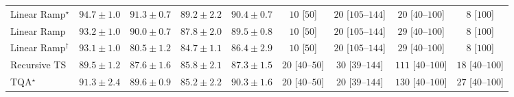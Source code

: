 \begin{tabular}{l|cccc|cccc|}
Linear Ramp$^\star$ & {\cellcolor[HTML]{00502D}} \color[HTML]{F1F1F1} $94.7\pm 1.0$ & {\cellcolor[HTML]{006536}} \color[HTML]{F1F1F1} $91.3\pm 0.7$ & {\cellcolor[HTML]{096F3A}} \color[HTML]{F1F1F1} $89.2\pm 2.2$ & {\cellcolor[HTML]{026A38}} \color[HTML]{F1F1F1} $90.4\pm 0.7$ & {\cellcolor[HTML]{FFF7F3}} \color[HTML]{000000} $10$ [$50$] & {\cellcolor[HTML]{FFF4F0}} \color[HTML]{000000} $20$ [$105$--$144$] & {\cellcolor[HTML]{FFF4F0}} \color[HTML]{000000} $20$ [$40$--$100$] & {\cellcolor[HTML]{FFF7F3}} \color[HTML]{000000} $8$ [$100$] \\
Linear Ramp & {\cellcolor[HTML]{005931}} \color[HTML]{F1F1F1} $93.2\pm 1.0$ & {\cellcolor[HTML]{056C39}} \color[HTML]{F1F1F1} $90.0\pm 0.7$ & {\cellcolor[HTML]{12763D}} \color[HTML]{F1F1F1} $87.8\pm 2.0$ & {\cellcolor[HTML]{086E3A}} \color[HTML]{F1F1F1} $89.5\pm 0.8$ & {\cellcolor[HTML]{FFF7F3}} \color[HTML]{000000} $10$ [$50$] & {\cellcolor[HTML]{FFF4F0}} \color[HTML]{000000} $20$ [$105$--$144$] & {\cellcolor[HTML]{FFF2EE}} \color[HTML]{000000} $29$ [$40$--$100$] & {\cellcolor[HTML]{FFF7F3}} \color[HTML]{000000} $8$ [$100$] \\
Linear Ramp$^\dagger$ & {\cellcolor[HTML]{005A31}} \color[HTML]{F1F1F1} $93.1\pm 1.0$ & {\cellcolor[HTML]{3BA358}} \color[HTML]{F1F1F1} $80.5\pm 1.2$ & {\cellcolor[HTML]{258745}} \color[HTML]{F1F1F1} $84.7\pm 1.1$ & {\cellcolor[HTML]{1A7D40}} \color[HTML]{F1F1F1} $86.4\pm 2.9$ & {\cellcolor[HTML]{FFF7F3}} \color[HTML]{000000} $10$ [$50$] & {\cellcolor[HTML]{FFF4F0}} \color[HTML]{000000} $20$ [$105$--$144$] & {\cellcolor[HTML]{FFF2EE}} \color[HTML]{000000} $29$ [$40$--$100$] & {\cellcolor[HTML]{FFF7F3}} \color[HTML]{000000} $8$ [$100$] \\
Recursive TS & {\cellcolor[HTML]{086E3A}} \color[HTML]{F1F1F1} $89.5\pm 1.2$ & {\cellcolor[HTML]{13773D}} \color[HTML]{F1F1F1} $87.6\pm 1.6$ & {\cellcolor[HTML]{1F8142}} \color[HTML]{F1F1F1} $85.8\pm 2.1$ & {\cellcolor[HTML]{15793E}} \color[HTML]{F1F1F1} $87.3\pm 1.5$ & {\cellcolor[HTML]{FFF4F0}} \color[HTML]{000000} $20$ [$40$--$50$] & {\cellcolor[HTML]{FFF2EE}} \color[HTML]{000000} $30$ [$39$--$144$] & {\cellcolor[HTML]{FDDEDB}} \color[HTML]{000000} $111$ [$40$--$100$] & {\cellcolor[HTML]{FFF5F1}} \color[HTML]{000000} $18$ [$40$--$100$] \\
TQA$^\star$ & {\cellcolor[HTML]{006536}} \color[HTML]{F1F1F1} $91.3\pm 2.4$ & {\cellcolor[HTML]{076D39}} \color[HTML]{F1F1F1} $89.6\pm 0.9$ & {\cellcolor[HTML]{228343}} \color[HTML]{F1F1F1} $85.2\pm 2.2$ & {\cellcolor[HTML]{026A38}} \color[HTML]{F1F1F1} $90.3\pm 1.6$ & {\cellcolor[HTML]{FFF4F0}} \color[HTML]{000000} $20$ [$40$--$50$] & {\cellcolor[HTML]{FFF4F0}} \color[HTML]{000000} $20$ [$39$--$144$] & {\cellcolor[HTML]{FDD9D6}} \color[HTML]{000000} $130$ [$40$--$100$] & {\cellcolor[HTML]{FFF3EF}} \color[HTML]{000000} $27$ [$40$--$100$] \\

\end{tabular}
